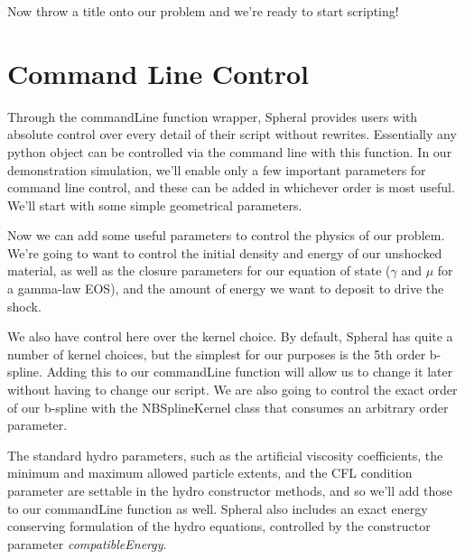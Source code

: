 \documentclass[11pt]{memoir}
\begin{document}


Now throw a title onto our problem and we're ready to start scripting!



\section{Command Line Control}

Through the commandLine function wrapper, Spheral provides users with absolute control over every detail of their script without rewrites. 
Essentially any python object can be controlled via the command line with this function. 
In our demonstration simulation, we'll enable only a few important parameters for command line control, and these can be added in whichever order is most useful. 
We'll start with some simple geometrical parameters.



Now we can add some useful parameters to control the physics of our problem. 
We're going to want to control the initial density and energy of our unshocked material, as well as the closure parameters for our equation of state ($\gamma$ and $\mu$ for a gamma-law EOS), and the amount of energy we want to deposit to drive the shock.



We also have control here over the kernel choice. 
By default, Spheral has quite a number of kernel choices, but the simplest for our purposes is the 5th order b-spline. 
Adding this to our commandLine function will allow us to change it later without having to change our script. 
We are also going to control the exact order of our b-spline with the NBSplineKernel class that consumes an arbitrary order parameter.



The standard hydro parameters, such as the artificial viscosity coefficients, the minimum and maximum allowed particle extents, and the CFL condition parameter are settable in the hydro constructor methods, and so we'll add those to our commandLine function as well. 
Spheral also includes an exact energy conserving formulation of the hydro equations, controlled by the constructor parameter \textit{compatibleEnergy}.
\end{document}
